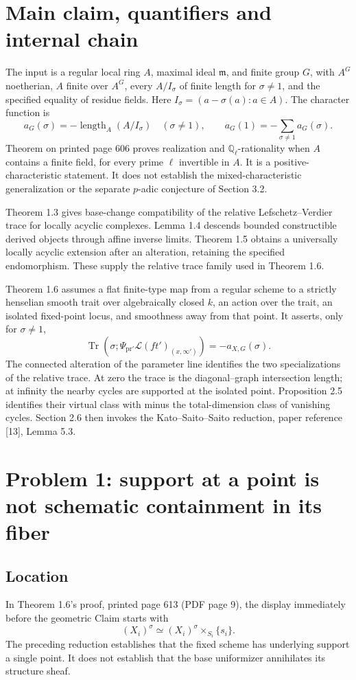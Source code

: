 \documentclass[10pt]{article}
\begin{document}
\section*{Main claim, quantifiers and internal chain}
The input is a regular local ring \(A\), maximal ideal \(\mathfrak m\), and finite group \(G\), with \(A^G\) noetherian, \(A\) finite over \(A^G\), every \(A/I_\sigma\) of finite length for \(\sigma\ne1\), and the specified equality of residue fields. Here \(I_\sigma=(a-\sigma(a):a\in A)\). The character function is \[a_G(\sigma)=-\operatorname{length}_A(A/I_\sigma)\quad(\sigma\ne1),
 \qquad a_G(1)=-\sum_{\sigma\ne1}a_G(\sigma).\] Theorem on printed page 606 proves realization and \(\mathbb Q_\ell\)-rationality when \(A\) contains a finite field, for every prime \(\ell\) invertible in \(A\). It is a positive-characteristic statement. It does not establish the mixed-characteristic generalization or the separate \(p\)-adic conjecture of Section 3.2.\par
Theorem 1.3 gives base-change compatibility of the relative Lefschetz–Verdier trace for locally acyclic complexes. Lemma 1.4 descends bounded constructible derived objects through affine inverse limits. Theorem 1.5 obtains a universally locally acyclic extension after an alteration, retaining the specified endomorphism. These supply the relative trace family used in Theorem 1.6.\par
Theorem 1.6 assumes a flat finite-type map from a regular scheme to a strictly henselian smooth trait over algebraically closed \(k\), an action over the trait, an isolated fixed-point locus, and smoothness away from that point. It asserts, only for \(\sigma\ne1\), \[\operatorname{Tr}\!\left(\sigma;
 \Psi_{\mathrm{pr}'}\mathcal L(ft')_{(x,\infty')}\right)
       =-a_{X,G}(\sigma).\] The connected alteration of the parameter line identifies the two specializations of the relative trace. At zero the trace is the diagonal–graph intersection length; at infinity the nearby cycles are supported at the isolated point. Proposition 2.5 identifies their virtual class with minus the total-dimension class of vanishing cycles. Section 2.6 then invokes the Kato–Saito–Saito reduction, paper reference [13], Lemma 5.3.\par
\section*{Problem 1: support at a point is not schematic containment in its fiber}
\subsection*{Location}
In Theorem 1.6’s proof, printed page 613 (PDF page 9), the display immediately before the geometric Claim starts with \[(X_i)^\sigma\simeq (X_i)^\sigma\times_{S_i}\{s_i\}.\] The preceding reduction establishes that the fixed scheme has underlying support a single point. It does not establish that the base uniformizer annihilates its structure sheaf.\par
\end{document}
